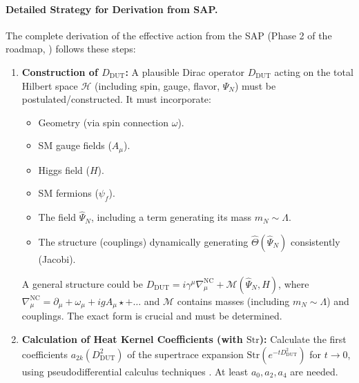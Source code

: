 \documentclass[11pt, a4paper]{article}
\theoremstyle{remark}
\newcommand{\Op}[1]{\hat{#1}}
\newcommand{\Str}{\mathrm{Str}}
\begin{document}
\paragraph{Detailed Strategy for Derivation from SAP.}
\label{ssubsec:pae_derivation_strategy_detailed}
The complete derivation of the effective action from the SAP (Phase 2 of the roadmap, ) follows these steps:
\begin{enumerate}[label=\arabic*., itemsep=1pt, topsep=2pt]
    \item \textbf{Construction of \( D_{\text{DUT}} \):}
    A plausible Dirac operator \( D_{\text{DUT}} \) acting on the total Hilbert space \( \mathcal{H} \) (including spin, gauge, flavor, \( \Psi_N \)) must be postulated/constructed. It must incorporate:
        \begin{itemize}
            \item Geometry (via spin connection \( \omega \)).
            \item SM gauge fields (\( A_\mu \)).
            \item Higgs field (\( H \)).
            \item SM fermions (\( \psi_f \)).
            \item The field \( \Op{\Psi}_N \), including a term generating its mass \( m_N \sim \Lambda \).
            \item The structure (couplings) dynamically generating \( \Op{\Theta}(\Op{\Psi}_N) \) consistently (Jacobi).
        \end{itemize}
    A general structure could be \( D_{\text{DUT}} = i \gamma^\mu \nabla_\mu^{\text{NC}} + \mathcal{M}(\Op{\Psi}_N, H) \), where \( \nabla_\mu^{\text{NC}} = \partial_\mu + \omega_\mu + i g A_\mu \star + \dots \) and \( \mathcal{M} \) contains masses (including \( m_N \sim \Lambda \)) and couplings. The exact form is crucial and must be determined.

    \item \textbf{Calculation of Heat Kernel Coefficients (with \( \Str \)):}
    Calculate the first coefficients \( a_{2k}(D_{\text{DUT}}^2) \) of the supertrace expansion \( \Str(e^{-t D_{\text{DUT}}^2}) \) for \( t \to 0 \), using pseudodifferential calculus techniques \citep{Vassilevich2003HeatKernel, Gilkey1995}. At least \( a_0, a_2, a_4 \) are needed.


\end{enumerate}
\end{document}
